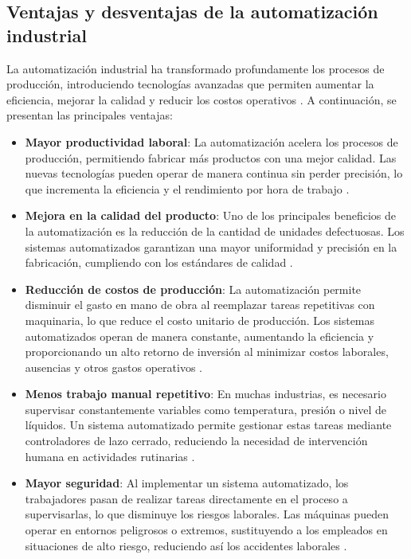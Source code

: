 \subsection{Ventajas y desventajas de la automatización industrial}

La automatización industrial ha transformado profundamente los procesos de producción, introduciendo tecnologías avanzadas que permiten aumentar la eficiencia, mejorar la calidad y reducir los costos operativos \cite{des_ventajas_1}. A continuación, se presentan las principales ventajas:

\begin{itemize}

 \item \textbf{Mayor productividad laboral}: La automatización acelera los procesos de producción, permitiendo fabricar más productos con una mejor calidad. Las nuevas tecnologías pueden operar de manera continua sin perder precisión, lo que incrementa la eficiencia y el rendimiento por hora de trabajo  \cite{des_ventajas_1}.

 \item \textbf{Mejora en la calidad del producto}: Uno de los principales beneficios de la automatización es la reducción de la cantidad de unidades defectuosas. Los sistemas automatizados garantizan una mayor uniformidad y precisión en la fabricación, cumpliendo con los estándares de calidad \cite{des_ventajas_2}.
   
\item \textbf{Reducción de costos de producción}: La automatización permite disminuir el gasto en mano de obra al reemplazar tareas repetitivas con maquinaria, lo que reduce el costo unitario de producción. Los sistemas automatizados operan de manera constante, aumentando la eficiencia y proporcionando un alto retorno de inversión al minimizar costos laborales, ausencias y otros gastos operativos \cite{des_ventajas_1}.

\item \textbf{Menos trabajo manual repetitivo}: En muchas industrias, es necesario supervisar constantemente variables como temperatura, presión o nivel de líquidos. Un sistema automatizado permite gestionar estas tareas mediante controladores de lazo cerrado, reduciendo la necesidad de intervención humana en actividades rutinarias \cite{des_ventajas_1}.

\item \textbf{Mayor seguridad}: Al implementar un sistema automatizado, los trabajadores pasan de realizar tareas directamente en el proceso a supervisarlas, lo que disminuye los riesgos laborales. Las máquinas pueden operar en entornos peligrosos o extremos, sustituyendo a los empleados en situaciones de alto riesgo, reduciendo así los accidentes laborales \cite{des_ventajas_2}.


\end{itemize}
